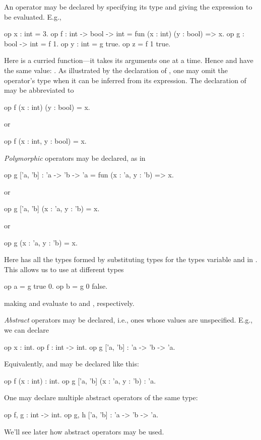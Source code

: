 An operator may be declared by specifying its type and giving the
expression to be evaluated. E.g.,
\begin{easycrypt}{}{}
op x : int = 3.
op f : int -> bool -> int = fun (x : int) (y : bool) => x.
op g : bool -> int = f 1.
op y : int = g true.
op z = f 1 true.
\end{easycrypt}
Here  is a curried function---it takes its arguments one
at a time. Hence  and  have the same value: .
As illustrated by the declaration of , one may omit the
operator's type when it can be inferred from its expression.
The declaration of  may be abbreviated to
\begin{easycrypt}{}{}
op f (x : int) (y : bool) = x.
\end{easycrypt}
or
\begin{easycrypt}{}{}
op f (x : int, y : bool) = x.
\end{easycrypt}

\emph{Polymorphic} operators may be declared, as in
\begin{easycrypt}{}{}
op g ['a, 'b] : 'a -> 'b -> 'a = fun (x : 'a, y : 'b) => x.
\end{easycrypt}
or
\begin{easycrypt}{}{}
op g ['a, 'b] (x : 'a, y : 'b) = x.
\end{easycrypt}
or
\begin{easycrypt}{}{}
op g (x : 'a, y : 'b) = x.
\end{easycrypt}
Here  has all the types formed
by substituting types for the types variable  and 
in . This allows us to use  at different
types
\begin{easycrypt}{}{}
op a = g true 0.
op b = g 0 false.
\end{easycrypt}
making  and  evaluate to  and , respectively.

\emph{Abstract} operators may be declared, i.e., ones whose values
are unspecified. E.g., we can declare
\begin{easycrypt}{}{}
op x : int.
op f : int -> int.
op g ['a, 'b] : 'a -> 'b -> 'a.
\end{easycrypt}
Equivalently,  and  may be declared like this:
\begin{easycrypt}{}{}
op f (x : int) : int.
op g ['a, 'b] (x : 'a, y : 'b) : 'a.
\end{easycrypt}
One may declare multiple abstract operators of the same type:
\begin{easycrypt}{}{}
op f, g : int -> int.
op g, h ['a, 'b] : 'a -> 'b -> 'a.
\end{easycrypt}
We'll see later how abstract operators may be used.

